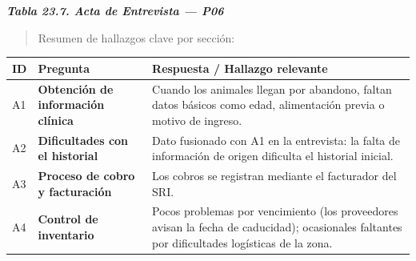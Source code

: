 \documentclass[
]{article}
\newcounter{none} %
\begin{document}
\protect{}\label{_bookmark_P06_acta}{}\emph{\textbf{Tabla 23.7. Acta de Entrevista --- P06}}

\begin{quote}
Resumen de hallazgos clave por sección:
\end{quote}

{\def\LTcaptype{none} %
\begin{longtable}[]{|
  >{\centering\arraybackslash}p{}|
  >{\raggedright\arraybackslash}p{}|
  >{\raggedright\arraybackslash}p{}|}
\hline
\begin{minipage}[b]{\linewidth}\centering
\textbf{ID}
\end{minipage} & \begin{minipage}[b]{\linewidth}\centering
\textbf{Pregunta}
\end{minipage} & \begin{minipage}[b]{\linewidth}\raggedright
\textbf{Respuesta / Hallazgo relevante}
\end{minipage} \\
\hline
\endhead
\hline
\endlastfoot
A1 & \textbf{Obtención de información clínica} &
\begin{minipage}[t]{\linewidth}\raggedright
Cuando los animales llegan por abandono, faltan datos básicos como edad, alimentación previa o motivo de ingreso.
\end{minipage} \\
\hline
A2 & \textbf{Dificultades con el historial} &
\begin{minipage}[t]{\linewidth}\raggedright
Dato fusionado con A1 en la entrevista: la falta de información de origen dificulta el historial inicial.
\end{minipage} \\
\hline
A3 & \textbf{Proceso de cobro y facturación} &
\begin{minipage}[t]{\linewidth}\raggedright
Los cobros se registran mediante el facturador del SRI.
\end{minipage} \\
\hline
A4 & \textbf{Control de inventario} &
\begin{minipage}[t]{\linewidth}\raggedright
Pocos problemas por vencimiento (los proveedores avisan la fecha de caducidad); ocasionales faltantes por dificultades logísticas de la zona.
\end{minipage} \\

\end{longtable}}
\end{document}
